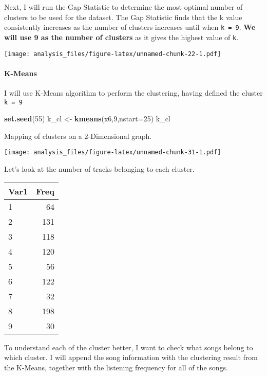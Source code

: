 \documentclass[
]{article}
\newenvironment{Shaded}{\begin{snugshade}}{\end{snugshade}}
\newcommand{\AttributeTok}[1]{\textcolor[rgb]{0.13,0.29,0.53}{#1}}
\newcommand{\DecValTok}[1]{\textcolor[rgb]{0.00,0.00,0.81}{#1}}
\newcommand{\FunctionTok}[1]{\textcolor[rgb]{0.13,0.29,0.53}{\textbf{#1}}}
\newcommand{\NormalTok}[1]{#1}
\newcommand{\OtherTok}[1]{\textcolor[rgb]{0.56,0.35,0.01}{#1}}
\begin{document}
Next, I will run the Gap Statistic to determine the most optimal number
of clusters to be used for the dataset. The Gap Statistic finds that the
k value consistently increases as the number of clusters increases until
when \texttt{k\ =\ 9}. \textbf{We will use 9 as the number of clusters}
as it gives the highest value of \texttt{k}.

\texttt{[image: analysis\_files/figure-latex/unnamed-chunk-22-1.pdf]}

\hypertarget{k-means}{%
\paragraph{K-Means}\label{k-means}}

I will use K-Means algorithm to perform the clustering, having defined
the cluster \texttt{k\ =\ 9}

\begin{Shaded}
\begin{Highlighting}[]
\FunctionTok{set.seed}\NormalTok{(}\DecValTok{55}\NormalTok{)}
\NormalTok{k\_cl }\OtherTok{\textless{}{-}} \FunctionTok{kmeans}\NormalTok{(x6,}\DecValTok{9}\NormalTok{,}\AttributeTok{nstart=}\DecValTok{25}\NormalTok{)}
\NormalTok{k\_cl }
\end{Highlighting}
\end{Shaded}

Mapping of clusters on a 2-Dimensional graph.

\texttt{[image: analysis\_files/figure-latex/unnamed-chunk-31-1.pdf]}

Let's look at the number of tracks belonging to each cluster.

\begin{table}
\centering
\begin{tabular}{l|r}
\hline
Var1 & Freq\\
\hline
1 & 64\\
\hline
2 & 131\\
\hline
3 & 118\\
\hline
4 & 120\\
\hline
5 & 56\\
\hline
6 & 122\\
\hline
7 & 32\\
\hline
8 & 198\\
\hline
9 & 30\\
\hline
\end{tabular}
\end{table}

To understand each of the cluster better, I want to check what songs
belong to which cluster. I will append the song information with the
clustering result from the K-Means, together with the listening
frequency for all of the songs.
\end{document}

